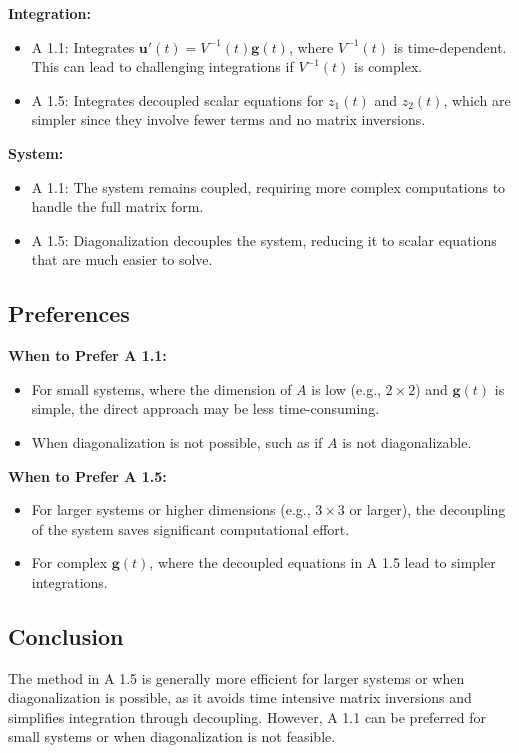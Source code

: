 \documentclass[12pt]{article}
\begin{document}
\textbf{Integration:}
\begin{itemize}
    \item A 1.1: Integrates \(\mathbf{u}'(t) = V^{-1}(t)\mathbf{g}(t)\), where \(V^{-1}(t)\) is time-dependent. This can lead to challenging integrations if \(V^{-1}(t)\) is complex.
    \item A 1.5: Integrates decoupled scalar equations for \(z_1(t)\) and \(z_2(t)\), which are simpler since they involve fewer terms and no matrix inversions.
\end{itemize}

\textbf{System:}
\begin{itemize}
    \item A 1.1: The system remains coupled, requiring more complex computations to handle the full matrix form.
    \item A 1.5: Diagonalization decouples the system, reducing it to scalar equations that are much easier to solve.
\end{itemize}

\subsection*{Preferences}
\textbf{When to Prefer A 1.1:}
\begin{itemize}
    \item For small systems, where the dimension of \(A\) is low (e.g., \(2 \times 2\)) and \(\mathbf{g}(t)\) is simple, the direct approach may be less time-consuming.
    \item When diagonalization is not possible, such as if \(A\) is not diagonalizable.
\end{itemize}

\textbf{When to Prefer A 1.5:}
\begin{itemize}
    \item For larger systems or higher dimensions (e.g., \(3 \times 3\) or larger), the decoupling of the system saves significant computational effort.
    \item For complex \(\mathbf{g}(t)\), where the decoupled equations in A 1.5 lead to simpler integrations.
\end{itemize}

\subsection*{Conclusion}
The method in A 1.5 is generally more efficient for larger systems or when diagonalization is possible, as it avoids time intensive matrix inversions and simplifies integration through decoupling. However, A 1.1 can be preferred for small systems or when diagonalization is not feasible.
\end{document}
